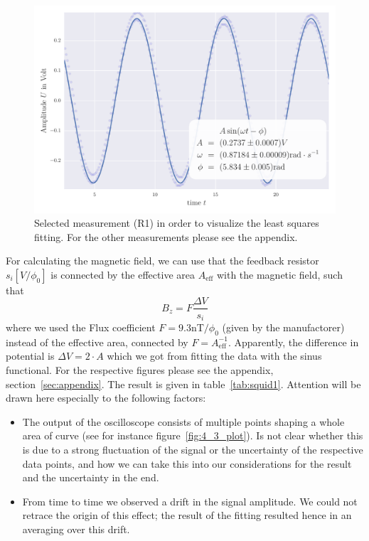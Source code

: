 \begin{figure}[H]
    \centering
    \includegraphics[width=1\linewidth]{analysis/figures/fit4_1}
    \caption{Selected measurement (R1) in order to visualize the least squares
    fitting. For the other measurements please see the appendix.}
    \label{fig:4_1_plot}
\end{figure}

For calculating the magnetic field, we can use \cite{ver} that
the feedback resistor $s_i [V/\phi_0]$ is connected by the effective area $A_{\mathrm{eff}}$
with the magnetic field, such that
\begin{equation}
B_z = F \frac{\Delta V}{s_i} 
\end{equation}
where we used the Flux coefficient $F = 9.3$nT$/\phi_0$ (given by the manufactorer) 
instead of the effective area, connected by $F = A_{\mathrm{eff}}^{-1}$. Apparently, the difference
in potential is $\Delta V = 2 \cdot A$ which we got from fitting the data with the sinus functional. 
For the respective figures please see the appendix, section~\ref{sec:appendix}. The
result is given in table~\ref{tab:squid1}.
Attention will be drawn here especially to the following factors:
\begin{itemize}
\item The output of the oscilloscope consists of multiple points shaping a
whole area of curve (see for instance figure~\ref{fig:4_3_plot}). Is not clear
whether this is due to a strong fluctuation of the signal or the uncertainty of the
respective data points, and how we can take this into our considerations 
for the result and the uncertainty in the end.
\item From time to time we observed a drift in the signal amplitude. We
could not retrace the origin of this effect; the result of the fitting 
resulted hence in an averaging over this drift.
\end{itemize}

